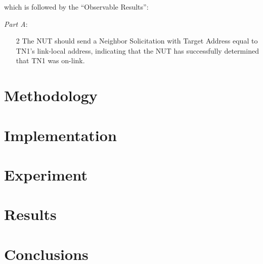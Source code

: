 \documentclass[12pt]{article}
\begin{document}
which is followed by the ``Observable Results'':

\textit{Part A}:
\vspace{-15pt}
\begin{enumerate}[noitemsep,topsep=0pt,partopsep=0pt]
 \item[2] The NUT should send a Neighbor Solicitation with Target Address equal to TN1’s link-local address, indicating that the NUT has successfully determined that TN1 was on-link.
\end{enumerate}






\pagebreak

\section{Methodology}
\label{sec:3}

\pagebreak

\section{Implementation}
\label{sec:4}

\pagebreak

\section{Experiment}
\label{sec:5}

\pagebreak

\section{Results}
\label{sec:6}

\pagebreak

\section{Conclusions}
\label{sec:7}

\pagebreak

\end{document}
